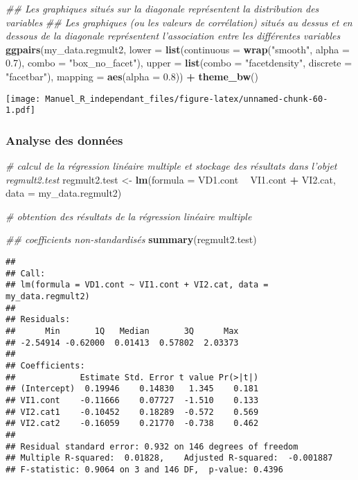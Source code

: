 \documentclass[
]{book}
\newenvironment{Shaded}{\begin{snugshade}}{\end{snugshade}}
\newcommand{\CommentTok}[1]{\textcolor[rgb]{0.56,0.35,0.01}{\textit{#1}}}
\newcommand{\DataTypeTok}[1]{\textcolor[rgb]{0.13,0.29,0.53}{#1}}
\newcommand{\FloatTok}[1]{\textcolor[rgb]{0.00,0.00,0.81}{#1}}
\newcommand{\KeywordTok}[1]{\textcolor[rgb]{0.13,0.29,0.53}{\textbf{#1}}}
\newcommand{\NormalTok}[1]{#1}
\newcommand{\OperatorTok}[1]{\textcolor[rgb]{0.81,0.36,0.00}{\textbf{#1}}}
\newcommand{\StringTok}[1]{\textcolor[rgb]{0.31,0.60,0.02}{#1}}
\begin{document}
\begin{Shaded}
\begin{Highlighting}[]
\CommentTok{## Les graphiques situés sur la diagonale représentent la distribution des variables}
\CommentTok{## Les graphiques (ou les valeurs de corrélation) situés au dessus et en dessous de la diagonale représentent l'association entre les différentes variables}
\KeywordTok{ggpairs}\NormalTok{(my_data.regmult2,}
        \DataTypeTok{lower =} \KeywordTok{list}\NormalTok{(}\DataTypeTok{continuous =} \KeywordTok{wrap}\NormalTok{(}\StringTok{"smooth"}\NormalTok{, }\DataTypeTok{alpha =} \FloatTok{0.7}\NormalTok{), }\DataTypeTok{combo =} \StringTok{"box_no_facet"}\NormalTok{),}
        \DataTypeTok{upper =} \KeywordTok{list}\NormalTok{(}\DataTypeTok{combo =} \StringTok{"facetdensity"}\NormalTok{, }\DataTypeTok{discrete =} \StringTok{"facetbar"}\NormalTok{), }
        \DataTypeTok{mapping =} \KeywordTok{aes}\NormalTok{(}\DataTypeTok{alpha =} \FloatTok{0.8}\NormalTok{)) }\OperatorTok{+}\StringTok{ }\KeywordTok{theme_bw}\NormalTok{()}
\end{Highlighting}
\end{Shaded}

\texttt{[image: Manuel\_R\_independant\_files/figure-latex/unnamed-chunk-60-1.pdf]}

\hypertarget{analyse-des-donnuxe9es-6}{%
\subsubsection{Analyse des données}\label{analyse-des-donnuxe9es-6}}

\begin{Shaded}
\begin{Highlighting}[]
\CommentTok{# calcul de la régression linéaire multiple et stockage des résultats dans l’objet regmult2.test}
\NormalTok{regmult2.test <-}\StringTok{ }\KeywordTok{lm}\NormalTok{(}\DataTypeTok{formula =}\NormalTok{ VD1.cont }\OperatorTok{~}\StringTok{ }\NormalTok{VI1.cont }\OperatorTok{+}\StringTok{ }\NormalTok{VI2.cat, }
                 \DataTypeTok{data =}\NormalTok{ my_data.regmult2)}

\CommentTok{# obtention des résultats de la régression linéaire multiple }

\CommentTok{## coefficients non-standardisés}
\KeywordTok{summary}\NormalTok{(regmult2.test)}
\end{Highlighting}
\end{Shaded}

\begin{verbatim}
## 
## Call:
## lm(formula = VD1.cont ~ VI1.cont + VI2.cat, data = my_data.regmult2)
## 
## Residuals:
##      Min       1Q   Median       3Q      Max 
## -2.54914 -0.62000  0.01413  0.57802  2.03373 
## 
## Coefficients:
##             Estimate Std. Error t value Pr(>|t|)
## (Intercept)  0.19946    0.14830   1.345    0.181
## VI1.cont    -0.11666    0.07727  -1.510    0.133
## VI2.cat1    -0.10452    0.18289  -0.572    0.569
## VI2.cat2    -0.16059    0.21770  -0.738    0.462
## 
## Residual standard error: 0.932 on 146 degrees of freedom
## Multiple R-squared:  0.01828,	Adjusted R-squared:  -0.001887 
## F-statistic: 0.9064 on 3 and 146 DF,  p-value: 0.4396
\end{verbatim}
\end{document}

